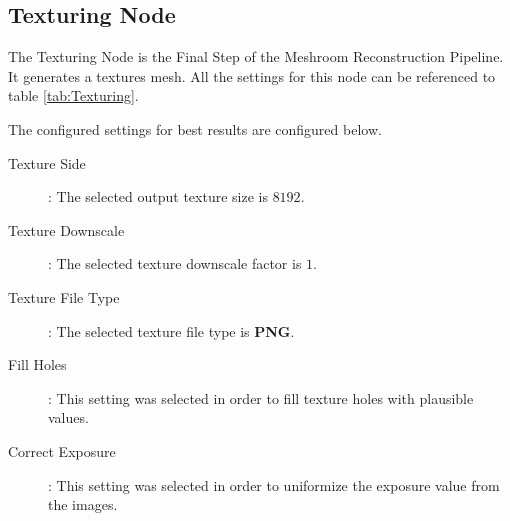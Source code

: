 \documentclass[12pt]{report}
\begin{document}
\subsection*{Texturing Node}
The Texturing Node is the Final Step of the Meshroom Reconstruction Pipeline. It generates a textures mesh. 
All the settings for this node can be referenced to table \ref{tab:Texturing}.

The configured settings for best results are configured below.
\begin{description}
  \item[Texture Side]: The selected output texture size is $8192$.
  \item[Texture Downscale]: The selected texture downscale factor is $1$.
  \item[Texture File Type]: The selected texture file type is \textbf{PNG}.  
  \item[Fill Holes]: This setting was selected in order to fill texture holes with plausible values.
  \item[Correct Exposure]: This setting was selected in order to uniformize the exposure value from the images.  
\end{description}
\end{document}
